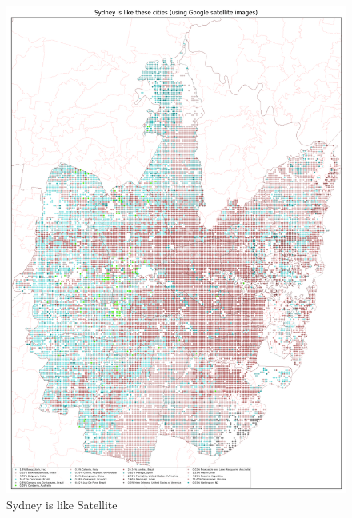 \documentclass[sageh,times]{sagej}
\begin{document}
\begin{figure}[!htbp]
\includegraphics[scale=0.20]{Images/SydneyOverallAbrev_sat.png} 
\caption{Sydney is like Satellite}    
 \label{fig:sydsat}  
\end{figure} 
\end{document}
